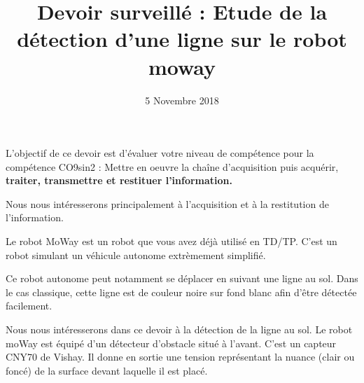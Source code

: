 \documentclass[10pt,fleqn]{article} %
\begin{document}
\title{Devoir surveillé : Etude de la détection d'une ligne sur le robot moway}
\date{5 Novembre 2018}
\maketitle
{}

\begin{obj}
L'objectif de ce devoir est d'évaluer votre niveau de compétence pour la compétence CO9sin2 : Mettre en oeuvre la chaîne d’acquisition puis acquérir,\textbf{ traiter, transmettre et restituer l’information. }

Nous nous intéresserons principalement à l'acquisition et à la restitution de l'information. 
 
\end{obj}

Le robot MoWay est un robot que vous avez déjà utilisé en TD/TP. C'est un robot simulant un véhicule autonome extrèmement simplifié.

Ce robot autonome peut notamment se déplacer en suivant une ligne au sol. Dans le cas classique, cette ligne est de couleur noire sur fond blanc afin d'être détectée facilement. 

Nous nous intéresserons dans ce devoir à la détection de la ligne au sol. 
Le robot moWay est équipé d'un détecteur d'obstacle situé à l'avant. C'est un capteur CNY70 de Vishay. Il donne en sortie une tension représentant la nuance (clair ou foncé) de la surface devant laquelle il est placé. 
\end{document}
